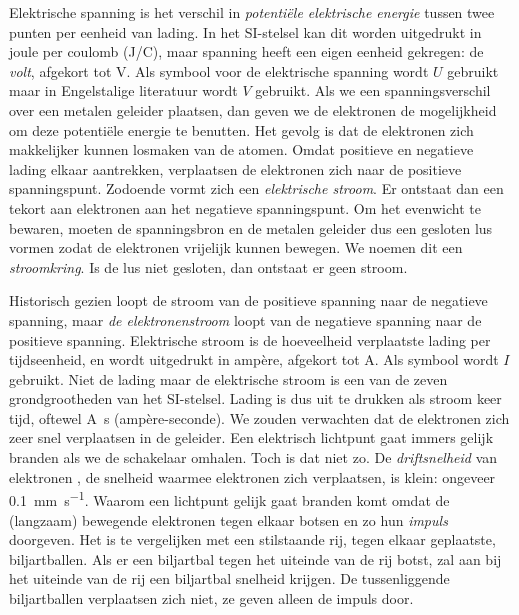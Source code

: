 Elektrische spanning is het verschil in \textsl{potentiële elektrische energie} tussen twee punten per eenheid van lading. In het SI-stelsel kan dit worden uitgedrukt in joule per coulomb (\si[per-mode=symbol]{\joule\per\coulomb}), maar spanning heeft een eigen eenheid gekregen: de \textsl{volt}, afgekort tot \si{\volt}. Als symbool voor de elektrische spanning wordt $U$ gebruikt maar in Engelstalige literatuur wordt $V$ gebruikt. Als we een spanningsverschil over een metalen geleider plaatsen, dan geven we de elektronen de mogelijkheid om deze potentiële energie te benutten. Het gevolg is dat de elektronen zich makkelijker kunnen losmaken van de atomen. Omdat positieve en negatieve lading elkaar aantrekken, verplaatsen de elektronen zich naar de positieve spanningspunt. Zodoende vormt zich een \textsl{elektrische stroom}. Er ontstaat dan een tekort aan elektronen aan het negatieve spanningspunt. Om het evenwicht te bewaren, moeten de spanningsbron en de metalen geleider dus een gesloten lus vormen zodat de elektronen vrijelijk kunnen bewegen. We noemen dit een \textsl{stroomkring}. Is de lus niet gesloten, dan ontstaat er geen stroom.

Historisch gezien loopt de stroom van de positieve spanning naar de negatieve spanning, maar \textsl{de elektronenstroom} loopt van de negatieve spanning naar de positieve spanning. Elektrische stroom is de hoeveelheid verplaatste lading per tijdseenheid, en wordt uitgedrukt in ampère, afgekort tot \si{\ampere}. Als symbool wordt $I$ gebruikt. Niet de lading maar de elektrische stroom is een van de zeven grondgrootheden van het SI-stelsel. Lading is dus uit te drukken als stroom keer tijd, oftewel \si{\ampere\second} (ampère-seconde). We zouden verwachten dat de elektronen zich zeer snel verplaatsen in de geleider. Een elektrisch lichtpunt gaat immers gelijk branden als we de schakelaar omhalen. Toch is dat niet zo. De \textsl{driftsnelheid} van elektronen , de snelheid waarmee elektronen zich verplaatsen, is klein: ongeveer \SI[per-mode=symbol]{0,1}{\milli\meter\per\second}. Waarom een lichtpunt gelijk gaat branden komt omdat de (langzaam) bewegende elektronen tegen elkaar botsen en zo hun \textsl{impuls} doorgeven. Het is te vergelijken met een stilstaande rij, tegen elkaar geplaatste, biljartballen. Als er een biljartbal tegen het uiteinde van de rij botst, zal aan bij het uiteinde van de rij een biljartbal snelheid krijgen. De tussenliggende biljartballen verplaatsen zich niet, ze geven alleen de impuls door. 




